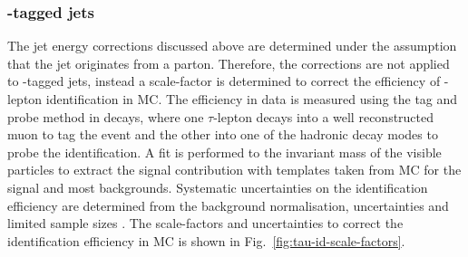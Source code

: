 \subsubsection{\Ptauh-tagged jets}

The jet energy corrections discussed above are determined under the assumption that the jet originates from a parton. Therefore, the corrections are not applied to \Ptauh-tagged jets, instead a scale-factor is determined to correct the efficiency of \Ptauh-lepton identification in MC. The efficiency in data is measured using the tag and probe method in \IDYtt decays, where one $\tau$-lepton decays into a well reconstructed muon to tag the event and the other into one of the hadronic decay modes to probe the identification. A fit is performed to the invariant mass of the visible particles to extract the signal contribution with templates taken from MC for the signal and most backgrounds. Systematic uncertainties on the identification efficiency are determined from the background normalisation, \ptmiss uncertainties and limited sample sizes \cite{Sirunyan:2018pgf}. The scale-factors and uncertainties to correct the \Ptauh identification efficiency in MC is shown in Fig.~\ref{fig:tau-id-scale-factors}.

